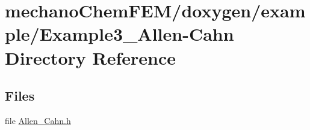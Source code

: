 \section{mechano\+Chem\+F\+E\+M/doxygen/example/\+Example3\+\_\+\+Allen-\/\+Cahn Directory Reference}
\label{dir_bf6af620bdd5c7265f3b21a58033c63f}
\subsection*{Files}
\begin{DoxyCompactItemize}
\item 
file \mbox{\hyperlink{_allen___cahn_8h}{Allen\+\_\+\+Cahn.\+h}}
\end{DoxyCompactItemize}
